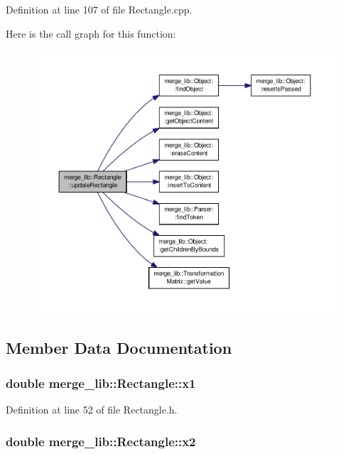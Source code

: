 Definition at line 107 of file Rectangle.\-cpp.



Here is the call graph for this function\-:
\nopagebreak
\begin{figure}[H]
\begin{center}
\leavevmode
\includegraphics[width=350pt]{da/d60/classmerge__lib_1_1_rectangle_aae4dc8f5494c96f19cde0771122a9267_cgraph}
\end{center}
\end{figure}




\subsection{Member Data Documentation}
\hypertarget{classmerge__lib_1_1_rectangle_ac2114ba824684a5e571ace001eae7e89}{
\subsubsection[{x1}]{\setlength{\rightskip}{0pt plus 5cm}double merge\-\_\-lib\-::\-Rectangle\-::x1}}\label{da/d60/classmerge__lib_1_1_rectangle_ac2114ba824684a5e571ace001eae7e89}


Definition at line 52 of file Rectangle.\-h.

\hypertarget{classmerge__lib_1_1_rectangle_a5f3b6541b34a0f5484cbb78cf1587854}{
\subsubsection[{x2}]{\setlength{\rightskip}{0pt plus 5cm}double merge\-\_\-lib\-::\-Rectangle\-::x2}}\label{da/d60/classmerge__lib_1_1_rectangle_a5f3b6541b34a0f5484cbb78cf1587854}


